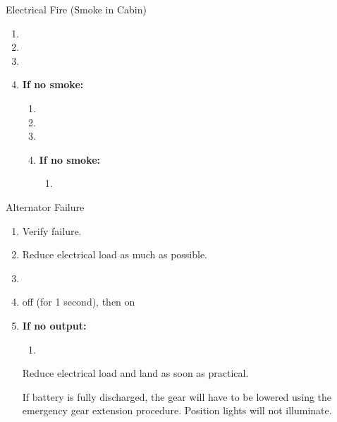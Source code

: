\begin{checklist_emerg}{Electrical Fire (Smoke in Cabin)}
    \begin{enumerate}
        \item {}
        \item {}
        \item {}
        \item{
            \textbf{If no smoke:}
            \begin{enumerate}
                \item {}
                \item {}
                \item {}
                \item{
                    \textbf{If no smoke:}
                    \begin{enumerate}
                        \item {}

                    \end{enumerate}
                }
            \end{enumerate}
        }
    \end{enumerate}
\end{checklist_emerg}

\begin{checklist_emerg}{Alternator Failure}
    \begin{enumerate}
        \item Verify failure.
        \item Reduce electrical load as much as possible.
        \item {}
        \item {}
                {off (for 1 second), then on}
        \item \textbf{If no output:}
        \begin{enumerate}
            \item {}
        \end{enumerate}
        Reduce electrical load and land as soon as practical.


        If battery is fully discharged, the gear will have to be lowered
        using the emergency gear extension procedure. Position lights 
        will not illuminate.
    \end{enumerate}
\end{checklist_emerg}

